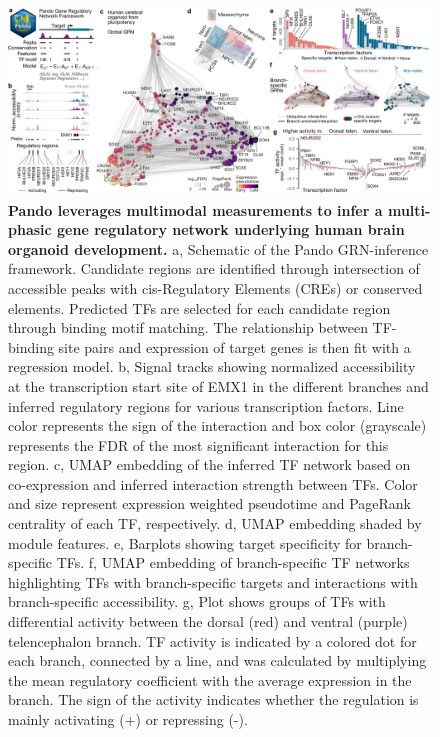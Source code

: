\begin{figure}[t!]
    \centering
	\includegraphics[width=\textwidth]{figures/pando/Figure_2}
    \caption{\textbf{Pando leverages multimodal measurements to infer a multi-phasic gene regulatory network underlying human brain organoid development.}
    a, Schematic of the Pando GRN-inference framework. Candidate regions are identified through intersection of accessible peaks with cis-Regulatory Elements (CREs) or conserved elements. Predicted TFs are selected for each candidate region through binding motif matching. The relationship between TF-binding site pairs and expression of target genes is then fit with a regression model. b, Signal tracks showing normalized accessibility at the transcription start site of EMX1 in the different branches and inferred regulatory regions for various transcription factors. Line color represents the sign of the interaction and box color (grayscale) represents the FDR of the most significant interaction for this region. c, UMAP embedding of the inferred TF network based on co-expression and inferred interaction strength between TFs. Color and size represent expression weighted pseudotime and PageRank centrality of each TF, respectively. d, UMAP embedding shaded by module features. e, Barplots showing target specificity for branch-specific TFs. f, UMAP embedding of branch-specific TF networks highlighting TFs with branch-specific targets and interactions with branch-specific accessibility. g, Plot shows groups of TFs with differential activity between the dorsal (red) and ventral (purple) telencephalon branch. TF activity is indicated by a colored dot for each branch, connected by a line, and was calculated by multiplying the mean regulatory coefficient with the average expression in the branch. The sign of the activity indicates whether the regulation is mainly activating (+) or repressing (-).}
    \label{fig:reg2}
\end{figure}
